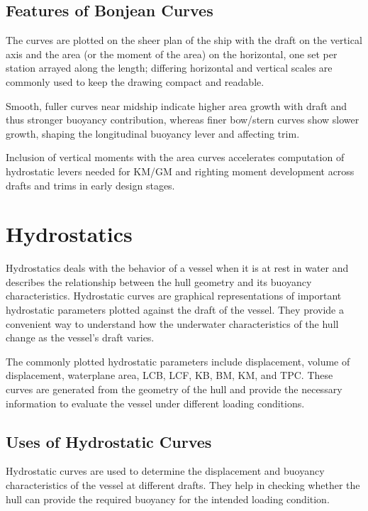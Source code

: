 \documentclass[12pt,a4paper,twoside]{report}
\begin{document}
\begin{table}[H]
\begin{tabular}{c c c c c}
\hline
\end{tabular}

\end{table}

\subsection{Features of Bonjean Curves}
The curves are plotted on the sheer plan of the ship with the draft on the vertical axis 
and the area (or the moment of the area) on the horizontal, one set per station arrayed along 
the length; differing horizontal and vertical scales are commonly used to keep the 
drawing compact and readable. 
\vspace{\baselineskip}\par\noindent Smooth, fuller curves near midship indicate higher area growth with draft 
and thus stronger buoyancy contribution, whereas finer bow/stern curves show slower 
growth, shaping the longitudinal buoyancy lever and affecting trim. 
\vspace{\baselineskip}\par\noindent Inclusion of vertical moments with the area curves accelerates computation 
of hydrostatic levers needed for KM/GM and righting moment development across 
drafts and trims in early design stages.

\section{Hydrostatics}
Hydrostatics deals with the behavior of a vessel when it is at rest in water and describes the relationship between the hull geometry and its buoyancy characteristics. Hydrostatic curves are graphical representations of important hydrostatic parameters plotted against the draft of the vessel. They provide a convenient way to understand how the underwater characteristics of the hull change as the vessel's draft varies.
\vspace{\baselineskip}\par\noindent The commonly plotted hydrostatic parameters include displacement, volume of displacement, waterplane area, LCB, LCF, KB, BM, KM, and TPC. These curves are generated from the geometry of the hull and provide the necessary information to evaluate the vessel under different loading conditions.
\subsection{Uses of Hydrostatic Curves}
Hydrostatic curves are used to determine the displacement and buoyancy characteristics of the vessel at different drafts. They help in checking whether the hull can provide the required buoyancy for the intended loading condition.
\end{document}
